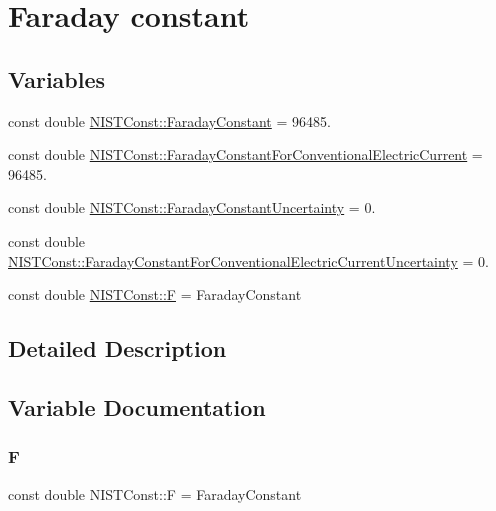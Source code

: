 \hypertarget{group___faraday_constant}{}\section{Faraday constant}
\label{group___faraday_constant}
\subsection*{Variables}
\begin{DoxyCompactItemize}
\item 
const double \hyperlink{group___faraday_constant_ga3a2104c5d85a6e687d615ec8004aa4c5}{N\+I\+S\+T\+Const\+::\+Faraday\+Constant} = 96485.
\item 
const double \hyperlink{group___faraday_constant_ga06079db2ebfcb103460b80a977171ac0}{N\+I\+S\+T\+Const\+::\+Faraday\+Constant\+For\+Conventional\+Electric\+Current} = 96485.
\item 
const double \hyperlink{group___faraday_constant_ga9b0f9181caac73b346e91602673272c1}{N\+I\+S\+T\+Const\+::\+Faraday\+Constant\+Uncertainty} = 0.
\item 
const double \hyperlink{group___faraday_constant_ga3b9280c2cf0f28e5ec6122b2f585eb81}{N\+I\+S\+T\+Const\+::\+Faraday\+Constant\+For\+Conventional\+Electric\+Current\+Uncertainty} = 0.
\item 
const double \hyperlink{group___faraday_constant_ga16166b57bc4bad7a648fbbc660ab88eb}{N\+I\+S\+T\+Const\+::F} = Faraday\+Constant
\end{DoxyCompactItemize}


\subsection{Detailed Description}


\subsection{Variable Documentation}
\mbox{\label{group___faraday_constant_ga16166b57bc4bad7a648fbbc660ab88eb}} 
\subsubsection{\texorpdfstring{F}{F}}
{\footnotesize\ttfamily const double N\+I\+S\+T\+Const\+::F = Faraday\+Constant}


